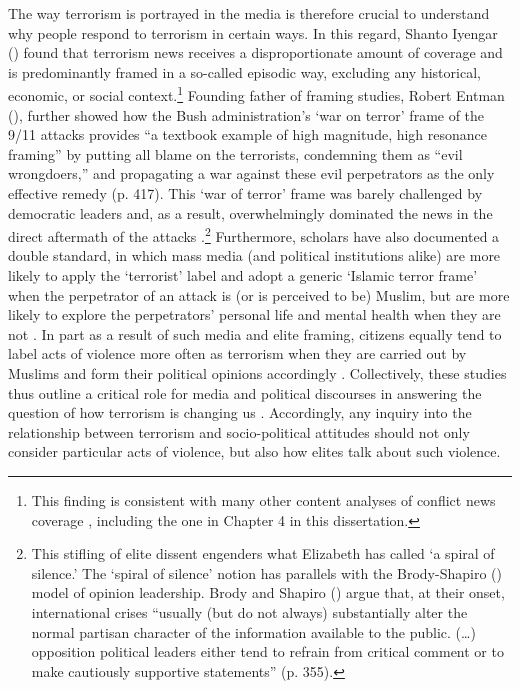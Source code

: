 The way terrorism is portrayed in the media is therefore crucial to understand why people respond to terrorism in certain ways. In this regard, Shanto Iyengar (\citeyear{Iyengar1991}) found that terrorism news receives a disproportionate amount of coverage and is predominantly framed in a so-called episodic way, excluding any historical, economic, or social context.\footnote{This finding is consistent with many other content analyses of conflict news coverage \citep[][p. 152]{Tenenboim-Weinblatt2016}, including the one in Chapter 4 in this dissertation.} Founding father of framing studies, Robert Entman (\citeyear{Entman2003}), further showed how the Bush administration's `war on terror' frame of the 9/11 attacks provides ``a textbook example of high magnitude, high resonance framing'' by putting all blame on the terrorists, condemning them as ``evil wrongdoers,'' and propagating a war against these evil perpetrators as the only effective remedy (p. 417). This `war of terror' frame was barely challenged by democratic leaders and, as a result, overwhelmingly dominated the news in the direct aftermath of the attacks \citep{Entman2003, Glazier2012}.\footnote{This stifling of elite dissent engenders what Elizabeth \cite{NoelleNeumann1974} has called `a spiral of silence.' The `spiral of silence' notion has parallels with the Brody-Shapiro (\citeyear{Brody1989}) model of opinion leadership. Brody and Shapiro (\citeyear{Brody1989}) argue that, at their onset, international crises ``usually (but do not always) substantially alter the normal partisan character of the information available to the public. (\dots) opposition political leaders either tend to refrain from critical comment or to make cautiously supportive statements'' (p. 355).} Furthermore, scholars have also documented a double standard, in which mass media (and political institutions alike) are more likely to apply the `terrorist' label and adopt a generic `Islamic terror frame' when the perpetrator of an attack is (or is perceived to be) Muslim, but are more likely to explore the perpetrators' personal life and mental health when they are not \citep{Powell2011}. In part as a result of such media and elite framing, citizens equally tend to label acts of violence more often as terrorism when they are carried out by Muslims \citep{DOrazio2018, Huff2018} and form their political opinions accordingly \citep{Piazza2015}. Collectively, these studies thus outline a critical role for media and political discourses in answering the question of how terrorism is changing us \citep[see also][]{Nacos2011, Terrorism}. Accordingly, any inquiry into the relationship between terrorism and socio-political attitudes should not only consider particular acts of violence, but also how elites talk about such violence.


